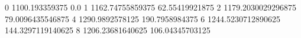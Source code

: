0 1100.193359375 0.0
1 1162.74755859375 62.55419921875
2 1179.2030029296875 79.0096435546875
4 1290.9892578125 190.7958984375
6 1244.5230712890625 144.3297119140625
8 1206.23681640625 106.04345703125
